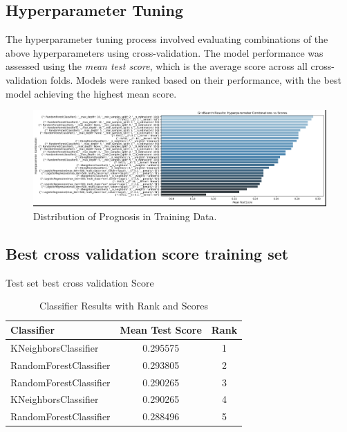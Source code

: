 \documentclass{article}
\begin{document}
\subsection{Hyperparameter Tuning}
The hyperparameter tuning process involved evaluating combinations of the above hyperparameters using cross-validation. The model performance was assessed using the \textit{mean test score}, which is the average score across all cross-validation folds. Models were ranked based on their performance, with the best model achieving the highest mean score.

\begin{figure}[t] %
    \centering
    \includegraphics[width=1
    \linewidth]{BenchMark.png}
    \caption{Distribution of Prognosis in Training Data.}
    \label{fig:disease_distribution}
    \vspace{-1em} %
\end{figure}
\subsection {Best cross validation score training set}
Test set best cross validation Score

\begin{table}[h!]
    \centering
    \caption{Classifier Results with Rank and Scores}
    \label{tab:classifier_ranks}
    \begin{tabular}{lcc}
    \toprule
    \textbf{Classifier}       & \textbf{Mean Test Score} & \textbf{Rank} \\
    \midrule
    KNeighborsClassifier      & 0.295575                & 1 \\
    RandomForestClassifier    & 0.293805                & 2 \\
    RandomForestClassifier    & 0.290265                & 3 \\
    KNeighborsClassifier      & 0.290265                & 4 \\
    RandomForestClassifier    & 0.288496                & 5 \\
    \bottomrule
    \end{tabular}
    \end{table}
\end{document}
